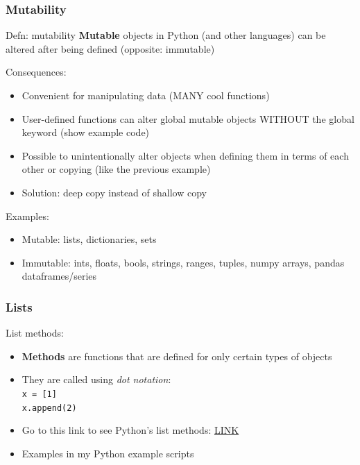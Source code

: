 \documentclass{beamer}
\newcommand{\code}[1]{\texttt{#1}}
\begin{document}
\begin{frame}	
	\frametitle{Mutability}
	
	\begin{alertblock}{Defn: mutability}
		\textbf{Mutable} objects in Python (and other languages) can be altered after being defined (opposite: immutable)
		
		\vspace{7pt}
		Consequences:
		\begin{itemize}
			\item Convenient for manipulating data (MANY cool functions)
			\item User-defined functions can alter global mutable objects WITHOUT the global keyword (show example code)
			\item Possible to unintentionally alter objects when defining them in terms of each other or copying (like the previous example)
			\item Solution: deep copy instead of shallow copy
		\end{itemize}
		
		Examples:
		\begin{itemize}
			\item Mutable: lists, dictionaries, sets
			\item Immutable: ints, floats, bools, strings, ranges, tuples, numpy arrays, pandas dataframes/series
		\end{itemize}
	\end{alertblock}
	
\end{frame}

\begin{frame}%
	\frametitle{Lists}
	
	\begin{block}{List methods:}
		\begin{itemize}
			\item \textbf{Methods} are functions that are defined for only certain types of objects
			\item They are called using \emph{dot notation}: \\
					\code{x = [1] \\
					x.append(2)}
			\item Go to this link to see Python's list methods: \href{https://docs.python.org/3/tutorial/datastructures.html}{LINK}
			\item Examples in my Python example scripts
		\end{itemize}
	\end{block}
	
\end{frame}
\end{document}
